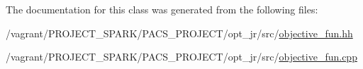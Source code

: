 The documentation for this class was generated from the following files\-:\begin{DoxyCompactItemize}
\item 
/vagrant/\-P\-R\-O\-J\-E\-C\-T\-\_\-\-S\-P\-A\-R\-K/\-P\-A\-C\-S\-\_\-\-P\-R\-O\-J\-E\-C\-T/opt\-\_\-jr/src/\hyperlink{objective__fun_8hh}{objective\-\_\-fun.\-hh}\item 
/vagrant/\-P\-R\-O\-J\-E\-C\-T\-\_\-\-S\-P\-A\-R\-K/\-P\-A\-C\-S\-\_\-\-P\-R\-O\-J\-E\-C\-T/opt\-\_\-jr/src/\hyperlink{objective__fun_8cpp}{objective\-\_\-fun.\-cpp}\end{DoxyCompactItemize}

